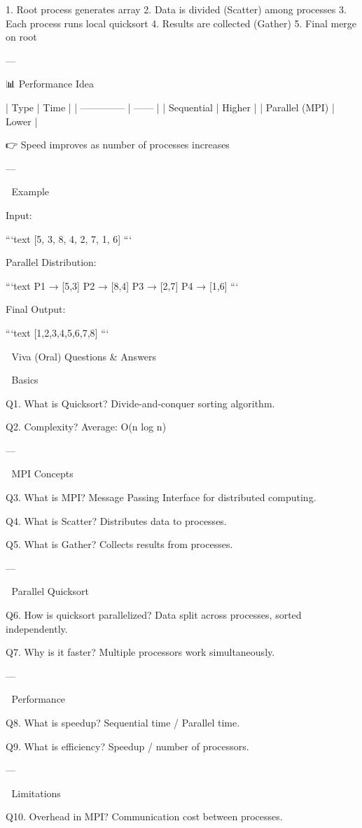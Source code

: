 1. Root process generates array
2. Data is divided (Scatter) among processes
3. Each process runs local quicksort
4. Results are collected (Gather)
5. Final merge on root

---

 📊 Performance Idea

| Type           | Time   |
| -------------- | ------ |
| Sequential     | Higher |
| Parallel (MPI) | Lower  |

👉 Speed improves as number of processes increases

---

 🔢 Example

 Input:

```text
[5, 3, 8, 4, 2, 7, 1, 6]
```

 Parallel Distribution:

```text
P1 → [5,3]
P2 → [8,4]
P3 → [2,7]
P4 → [1,6]
```

 Final Output:

```text
[1,2,3,4,5,6,7,8]
```


 🎯 Viva (Oral) Questions & Answers

 🔹 Basics

Q1. What is Quicksort?
Divide-and-conquer sorting algorithm.

Q2. Complexity?
Average: O(n log n)

---

 🔹 MPI Concepts

Q3. What is MPI?
Message Passing Interface for distributed computing.

Q4. What is Scatter?
Distributes data to processes.

Q5. What is Gather?
Collects results from processes.

---

 🔹 Parallel Quicksort

Q6. How is quicksort parallelized?
Data split across processes, sorted independently.

Q7. Why is it faster?
Multiple processors work simultaneously.

---

 🔹 Performance

Q8. What is speedup?
Sequential time / Parallel time.

Q9. What is efficiency?
Speedup / number of processors.

---

 🔹 Limitations

Q10. Overhead in MPI?
Communication cost between processes.



